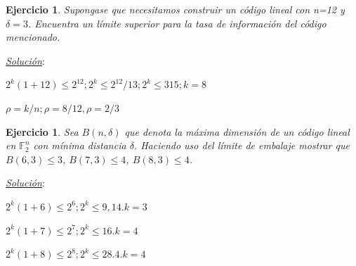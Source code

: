 \documentclass{beamer}
\theoremstyle{plain}
\theoremstyle{example}
\newtheorem{ejercicio} [Ejercicio]{Ejercicio}
\theoremstyle{example}
\begin{document}
\begin{frame}  \small \begin{ejercicio} 

Supongase que necesitamos construir un código lineal con n=12 y $\delta =3$. Encuentra un límite superior para la tasa de información del código mencionado.

\end{ejercicio} %
\textit{\underline{Solución}}:\\ 
\vspace{0.3cm}

$2^k (1+12) \leq 2^{12};  2^k  \leq 2^{12} /13;  2^k  \leq  315; k=8$

$\rho = k / n; \rho = 8 /12, \rho = 2/3$

\end{frame} 






\begin{frame}  \small \begin{ejercicio} 

Sea $B(n,\delta)$ que denota la máxima dimensión de un código lineal en $\mathbb{F}_2^n$ con mínima distancia $\delta$. Haciendo uso del límite de embalaje mostrar que $B(6,3) \leq 3$,	$B(7,3) \leq 4$,	$B(8,3) \leq 4$.

\end{ejercicio} %
\textit{\underline{Solución}}:\\ 
\vspace{0.3cm}

$2^k (1+6) \leq 2^6; 2^k \leq 9,14. k =3$

$2^k (1+7) \leq 2^7; 2^k \leq 16. k=4$

$2^k (1+8) \leq 2^8; 2^k \leq 28.4. k=4$

\end{frame} 






\end{document}
